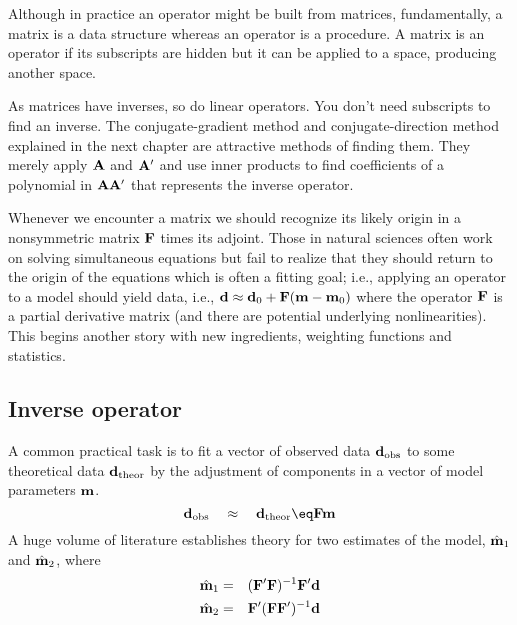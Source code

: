 \par
Although in practice an operator might be built from matrices,
fundamentally,
a matrix is a data structure whereas
an operator is a procedure.
A matrix is an operator if its subscripts are hidden
but it can be applied to a space, producing another space.
\par
As matrices have inverses, so do linear operators.
You don't need subscripts to find an inverse.
The
conjugate-gradient method and
conjugate-direction method
explained in the next chapter
are attractive methods of finding them.
They merely apply
$\bold A$
and
$\bold A'$
and use inner products to find coefficients
of a polynomial in
$\bold A\bold A'$
that represents the inverse operator.
\par
Whenever we encounter a  matrix we should recognize
its likely origin in a nonsymmetric matrix
$\bold F$
times its adjoint.
Those in
natural sciences often work on solving simultaneous equations but fail
to realize that they should return to the origin of the equations
which is often a fitting goal; i.e.,
applying an operator to a model should yield data,
i.e.,
$\bold d  \approx  \bold d_0 + \bold F(\bold m-\bold m_0)$
where the operator
$\bold F$
is a partial derivative matrix
(and there are potential underlying nonlinearities).
This begins another story with new ingredients,
weighting functions and statistics.

\subsection{Inverse operator}
A common practical task is to fit a vector of observed data
$\bold d_{\rm obs}$
to some theoretical data
$\bold d_{\rm theor}$
by the adjustment of components in a vector of model parameters $\bold m$.
\begin{equation}
\bold d_{\rm obs}
\quad\approx\quad
\bold d_{\rm theor}
\eq
\bold F \bold m
\label{eqn:wefit}
\end{equation}
A huge volume of literature establishes theory for two estimates
of the model,
$\hat {\bold m}_1$ and
$\hat {\bold m}_2$, where
\begin{eqnarray}
\hat {\bold m}_1 &=& (\bold F'\bold F)^{-1}\bold F'\bold d
                                                \label{eqn:overdeterm} \\
\hat {\bold m}_2 &=& \bold F'(\bold F\bold F')^{-1}\bold d
                                                \label{eqn:underdeterm}
\end{eqnarray}

